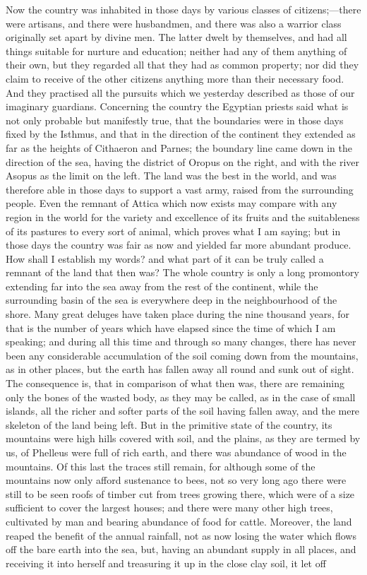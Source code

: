 \documentclass[11pt,letter]{article}
\begin{document}
\par  Now the country was inhabited in those days by various classes of citizens;—there were artisans, and there were husbandmen, and there was also a warrior class originally set apart by divine men. The latter dwelt by themselves, and had all things suitable for nurture and education; neither had any of them anything of their own, but they regarded all that they had as common property; nor did they claim to receive of the other citizens anything more than their necessary food. And they practised all the pursuits which we yesterday described as those of our imaginary guardians. Concerning the country the Egyptian priests said what is not only probable but manifestly true, that the boundaries were in those days fixed by the Isthmus, and that in the direction of the continent they extended as far as the heights of Cithaeron and Parnes; the boundary line came down in the direction of the sea, having the district of Oropus on the right, and with the river Asopus as the limit on the left. The land was the best in the world, and was therefore able in those days to support a vast army, raised from the surrounding people. Even the remnant of Attica which now exists may compare with any region in the world for the variety and excellence of its fruits and the suitableness of its pastures to every sort of animal, which proves what I am saying; but in those days the country was fair as now and yielded far more abundant produce. How shall I establish my words? and what part of it can be truly called a remnant of the land that then was? The whole country is only a long promontory extending far into the sea away from the rest of the continent, while the surrounding basin of the sea is everywhere deep in the neighbourhood of the shore. Many great deluges have taken place during the nine thousand years, for that is the number of years which have elapsed since the time of which I am speaking; and during all this time and through so many changes, there has never been any considerable accumulation of the soil coming down from the mountains, as in other places, but the earth has fallen away all round and sunk out of sight. The consequence is, that in comparison of what then was, there are remaining only the bones of the wasted body, as they may be called, as in the case of small islands, all the richer and softer parts of the soil having fallen away, and the mere skeleton of the land being left. But in the primitive state of the country, its mountains were high hills covered with soil, and the plains, as they are termed by us, of Phelleus were full of rich earth, and there was abundance of wood in the mountains. Of this last the traces still remain, for although some of the mountains now only afford sustenance to bees, not so very long ago there were still to be seen roofs of timber cut from trees growing there, which were of a size sufficient to cover the largest houses; and there were many other high trees, cultivated by man and bearing abundance of food for cattle. Moreover, the land reaped the benefit of the annual rainfall, not as now losing the water which flows off the bare earth into the sea, but, having an abundant supply in all places, and receiving it into herself and treasuring it up in the close clay soil, it let off 
\end{document}
